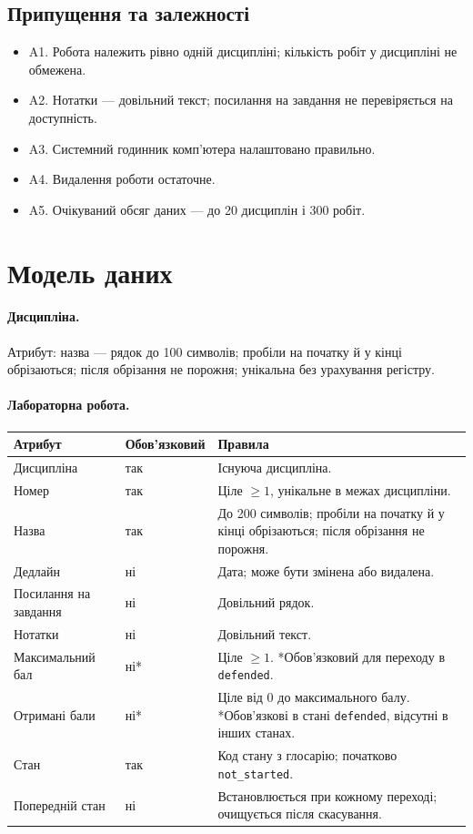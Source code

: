 \documentclass[12pt,a4paper]{article}
\newcommand{\code}[1]{\texttt{#1}}
\begin{document}
\subsection{Припущення та залежності}
\begin{itemize}[nosep]
  \item A1. Робота належить рівно одній дисципліні; кількість робіт у дисципліні не обмежена.
  \item A2. Нотатки --- довільний текст; посилання на завдання не перевіряється на доступність.
  \item A3. Системний годинник комп'ютера налаштовано правильно.
  \item A4. Видалення роботи остаточне.
  \item A5. Очікуваний обсяг даних --- до 20 дисциплін і 300 робіт.
\end{itemize}

\section{Модель даних}

\paragraph{Дисципліна.}
Атрибут: назва --- рядок до 100 символів; пробіли на початку й у кінці обрізаються; після обрізання не порожня; унікальна без урахування регістру.

\paragraph{Лабораторна робота.}
\begin{longtable}{>{\raggedright}p{} >{\raggedright}p{} p{}}
\toprule
\textbf{Атрибут} & \textbf{Обов'язковий} & \textbf{Правила} \\
\midrule
Дисципліна & так & Існуюча дисципліна. \\
Номер & так & Ціле $\ge 1$, унікальне в межах дисципліни. \\
Назва & так & До 200 символів; пробіли на початку й у кінці обрізаються; після обрізання не порожня. \\
Дедлайн & ні & Дата; може бути змінена або видалена. \\
Посилання на завдання & ні & Довільний рядок. \\
Нотатки & ні & Довільний текст. \\
Максимальний бал & ні* & Ціле $\ge 1$. *Обов'язковий для переходу в \code{defended}. \\
Отримані бали & ні* & Ціле від 0 до максимального балу. *Обов'язкові в стані \code{defended}, відсутні в інших станах. \\
Стан & так & Код стану з глосарію; початково \code{not\_started}. \\
Попередній стан & ні & Встановлюється при кожному переході; очищується після скасування. \\
\bottomrule
\end{longtable}
\end{document}
